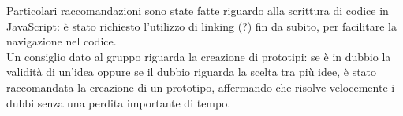 \documentclass[RaccoltaVerbali.tex]{subfiles}
\begin{document}
Particolari raccomandazioni sono state fatte riguardo alla scrittura di codice in JavaScript: è stato richiesto l'utilizzo di linking (?) fin da subito, per facilitare la navigazione nel codice.\\
Un consiglio dato al gruppo riguarda la creazione di prototipi: se è in dubbio la validità di un'idea oppure se il dubbio riguarda la scelta tra più idee, è stato raccomandata la creazione di un prototipo, affermando che risolve velocemente i dubbi senza una perdita importante di tempo.
\end{document}
